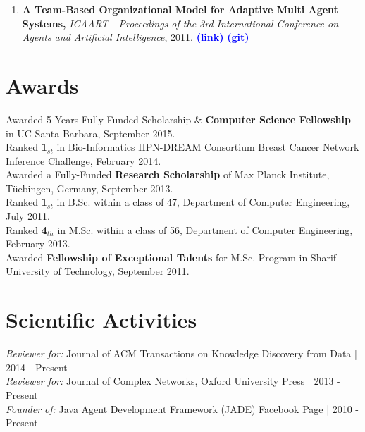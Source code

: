 \documentclass[letter]{res}
\begin{document}
\begin{resume}
\begin{enumerate}[leftmargin=-.01in]
			
			\item \textbf{A Team-Based Organizational Model for Adaptive Multi Agent Systems,} \textit{ICAART - Proceedings of the 3rd International Conference on Agents and Artificial Intelligence}, 2011.
			{\href{https://www.researchgate.net/publication/221539731_A_Team-based_Organizational_Model_for_Adaptive_Multi-agent_Systems}{\textbf{\textcolor{blue}{(link)}}}}
			{\href{https://github.com/omid55/team_based_rescue_jade_multi_agent_system}{\textbf{\textcolor{blue}{(git)}}}}
			
		\end{enumerate}
		
		
		\section{Awards}
		Awarded 5 Years Fully-Funded Scholarship \& \textbf{Computer Science Fellowship} in UC Santa Barbara, September 2015.\\
		Ranked \textbf{1}$_{st}$ in Bio-Informatics HPN-DREAM Consortium Breast Cancer Network Inference Challenge, February 2014.\\
		Awarded a Fully-Funded \textbf{Research Scholarship} of Max Planck Institute, Tüebingen, Germany, September 2013.\\
		Ranked \textbf{1}$_{st}$ in B.Sc. within a class of 47, Department of Computer Engineering, July 2011.\\
		Ranked \textbf{4}$_{th}$ in M.Sc. within a class of 56, Department of Computer Engineering, February 2013.\\
		Awarded \textbf{Fellowship of Exceptional Talents} for M.Sc. Program in Sharif University of Technology, September 2011.
		
		
		\section{Scientific Activities}
		{\sl Reviewer for:  }Journal of ACM Transactions on Knowledge Discovery from Data | 2014 - Present\\
		{\sl Reviewer for:  }Journal of Complex Networks, Oxford University Press | 2013 - Present\\
		{\sl Founder of:  }Java Agent Development Framework (JADE) Facebook Page | 2010 - Present
		

\end{resume}
\end{document}
